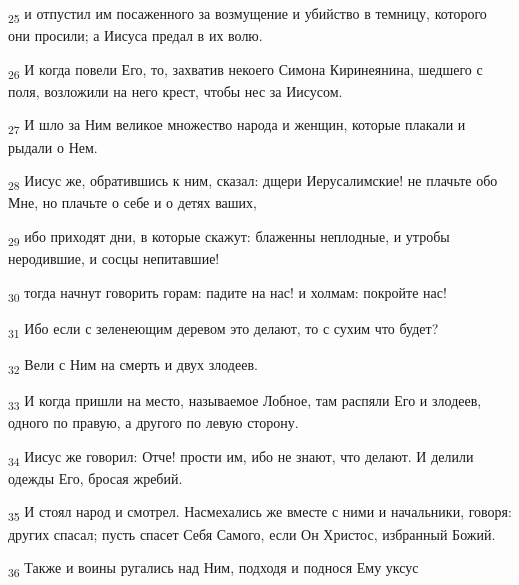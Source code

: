 \begin{tcolorbox}
\textsubscript{25} и отпустил им посаженного за возмущение и убийство в темницу, которого они просили; а Иисуса предал в их волю.
\end{tcolorbox}
\begin{tcolorbox}
\textsubscript{26} И когда повели Его, то, захватив некоего Симона Киринеянина, шедшего с поля, возложили на него крест, чтобы нес за Иисусом.
\end{tcolorbox}
\begin{tcolorbox}
\textsubscript{27} И шло за Ним великое множество народа и женщин, которые плакали и рыдали о Нем.
\end{tcolorbox}
\begin{tcolorbox}
\textsubscript{28} Иисус же, обратившись к ним, сказал: дщери Иерусалимские! не плачьте обо Мне, но плачьте о себе и о детях ваших,
\end{tcolorbox}
\begin{tcolorbox}
\textsubscript{29} ибо приходят дни, в которые скажут: блаженны неплодные, и утробы неродившие, и сосцы непитавшие!
\end{tcolorbox}
\begin{tcolorbox}
\textsubscript{30} тогда начнут говорить горам: падите на нас! и холмам: покройте нас!
\end{tcolorbox}
\begin{tcolorbox}
\textsubscript{31} Ибо если с зеленеющим деревом это делают, то с сухим что будет?
\end{tcolorbox}
\begin{tcolorbox}
\textsubscript{32} Вели с Ним на смерть и двух злодеев.
\end{tcolorbox}
\begin{tcolorbox}
\textsubscript{33} И когда пришли на место, называемое Лобное, там распяли Его и злодеев, одного по правую, а другого по левую сторону.
\end{tcolorbox}
\begin{tcolorbox}
\textsubscript{34} Иисус же говорил: Отче! прости им, ибо не знают, что делают. И делили одежды Его, бросая жребий.
\end{tcolorbox}
\begin{tcolorbox}
\textsubscript{35} И стоял народ и смотрел. Насмехались же вместе с ними и начальники, говоря: других спасал; пусть спасет Себя Самого, если Он Христос, избранный Божий.
\end{tcolorbox}
\begin{tcolorbox}
\textsubscript{36} Также и воины ругались над Ним, подходя и поднося Ему уксус
\end{tcolorbox}
